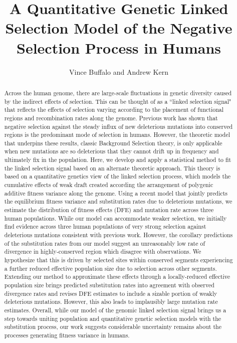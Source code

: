 \documentclass[11pt]{article}
\title{A Quantitative Genetic Linked Selection Model of the Negative Selection Process in Humans}
\author{Vince Buffalo and Andrew Kern}
\begin{document}
\maketitle

\begin{abstract}

    Across the human genome, there are large-scale fluctuations in genetic
    diversity caused by the indirect effects of selection. This can be thought
    of as a ``linked selection signal" that reflects the effects of selection
    varying according to the placement of functional regions and recombination
    rates along the genome. Previous work has shown that negative selection
    against the steady influx of new deleterious mutations into conserved
    regions is the predominant mode of selection in humans. However, the
    theoretic model that underpins these results, classic Background Selection
    theory, is only applicable when new mutations are so deleterious that they
    cannot drift up in frequency and ultimately fix in the population. Here, we
    develop and apply a statistical method to fit the linked selection signal
    based on an alternate theoretic approach. This theory is based on a
    quantitative genetics view of the linked selection process, which models
    the cumulative effects of weak draft created according the arrangement of
    polygenic additive fitness variance along the genome. Using a recent model
    that jointly predicts the equilibrium fitness variance and substitution
    rates due to deleterious mutations, we estimate the distribution of fitness
    effects (DFE) and mutation rate across three human populations. While our
    model can accommodate weaker selection, we initially find evidence across
    three human populations of very strong selection against deleterious
    mutations consistent with previous work. However, the corollary predictions
    of the substitution rates from our model suggest an unreasonably low rate
    of divergence in highly-conserved region which disagree with observations.
    We hypothesize that this is driven by selected sites within conserved
    segments experiencing a further reduced effective population size due to
    selection across other segments. Extending our method to approximate these
    effects through a locally-reduced effective population size brings
    predicted substitution rates into agreement with observed divergence rates
    and revises DFE estimates to include a sizable portion of weakly
    deleterious mutations. However, this also leads to implausibly large
    mutation rate estimates. Overall, while our model of the genomic linked
    selection signal brings us a step towards uniting population and
    quantitative genetic selection models with the substitution process, our
    work suggests considerable uncertainty remains about the processes
generating fitness variance in humans.

\end{abstract}
\end{document}
